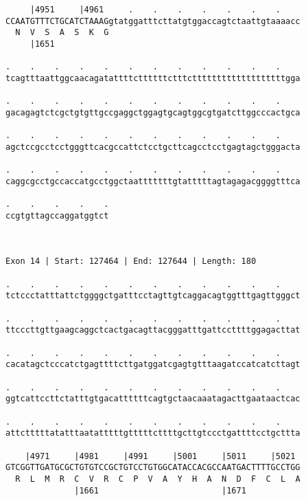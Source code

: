 \documentclass{article}
\begin{document}
\begin{Verbatim}
     |4951     |4961     .    .    .    .    .    .    .    
CCAATGTTTCTGCATCTAAAGgtatggatttcttatgtggaccagtctaattgtaaaacc
  N  V  S  A  S  K  G                                       
     |1651                                                  
  
.    .    .    .    .    .    .    .    .    .    .    .    
tcagtttaattggcaacagatattttcttttttctttctttttttttttttttttttgga
                                                            
.    .    .    .    .    .    .    .    .    .    .    .    
gacagagtctcgctgtgttgccgaggctggagtgcagtggcgtgatcttggcccactgca
                                                            
.    .    .    .    .    .    .    .    .    .    .    .    
agctccgcctcctgggttcacgccattctcctgcttcagcctcctgagtagctgggacta
                                                            
.    .    .    .    .    .    .    .    .    .    .    .    
caggcgcctgccaccatgcctggctaatttttttgtatttttagtagagacggggtttca
                                                            
.    .    .    .    .
ccgtgttagccaggatggtct
                     
                     
 
Exon 14 | Start: 127464 | End: 127644 | Length: 180
 
.    .    .    .    .    .    .    .    .    .    .    .    
tctccctatttattctggggctgatttcctagttgtcaggacagtggtttgagttgggct
                                                            
.    .    .    .    .    .    .    .    .    .    .    .    
ttcccttgttgaagcaggctcactgacagttacgggatttgattccttttggagacttat
                                                            
.    .    .    .    .    .    .    .    .    .    .    .    
cacatagctcccatctgagttttcttgatggatcgagtgtttaagatccatcatcttagt
                                                            
.    .    .    .    .    .    .    .    .    .    .    .    
ggtcattccttctatttgtgacattttttcagtgctaacaaatagacttgaataactcac
                                                            
.    .    .    .    .    .    .    .    .    .    .    .    
attctttttatatttaatatttttgtttttcttttgcttgtccctgattttcctgcttta
                                                            
    |4971     |4981     |4991     |5001     |5011     |5021 
GTCGGTTGATGCGCTGTGTCCGCTGTCCTGTGGCATACCACGCCAATGACTTTTGCCTGG
  R  L  M  R  C  V  R  C  P  V  A  Y  H  A  N  D  F  C  L  A
              |1661                         |1671           
  

\end{Verbatim}
\end{document}
